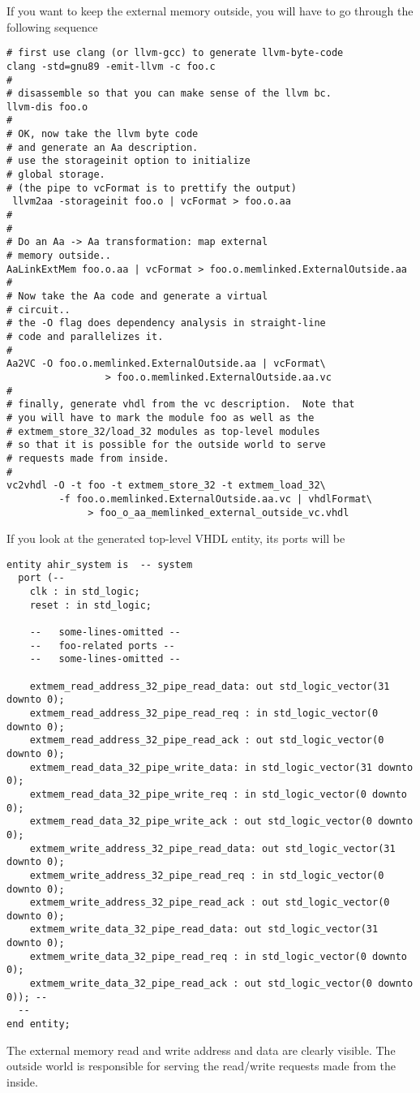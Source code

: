 If you want to keep the external memory
outside, you will have to go through the following sequence
\begin{verbatim}
# first use clang (or llvm-gcc) to generate llvm-byte-code
clang -std=gnu89 -emit-llvm -c foo.c
#
# disassemble so that you can make sense of the llvm bc.
llvm-dis foo.o
#
# OK, now take the llvm byte code
# and generate an Aa description.
# use the storageinit option to initialize
# global storage.
# (the pipe to vcFormat is to prettify the output)
 llvm2aa -storageinit foo.o | vcFormat > foo.o.aa
#
#
# Do an Aa -> Aa transformation: map external
# memory outside..
AaLinkExtMem foo.o.aa | vcFormat > foo.o.memlinked.ExternalOutside.aa
#
# Now take the Aa code and generate a virtual
# circuit..
# the -O flag does dependency analysis in straight-line
# code and parallelizes it.
#
Aa2VC -O foo.o.memlinked.ExternalOutside.aa | vcFormat\
                 > foo.o.memlinked.ExternalOutside.aa.vc
#
# finally, generate vhdl from the vc description.  Note that
# you will have to mark the module foo as well as the
# extmem_store_32/load_32 modules as top-level modules
# so that it is possible for the outside world to serve
# requests made from inside.
#
vc2vhdl -O -t foo -t extmem_store_32 -t extmem_load_32\ 
         -f foo.o.memlinked.ExternalOutside.aa.vc | vhdlFormat\
              > foo_o_aa_memlinked_external_outside_vc.vhdl

\end{verbatim}

If you look at the generated top-level VHDL entity, its ports
will be
\begin{verbatim}
entity ahir_system is  -- system
  port (--
    clk : in std_logic;
    reset : in std_logic;

    --   some-lines-omitted --
    --   foo-related ports --
    --   some-lines-omitted --

    extmem_read_address_32_pipe_read_data: out std_logic_vector(31 downto 0);
    extmem_read_address_32_pipe_read_req : in std_logic_vector(0 downto 0);
    extmem_read_address_32_pipe_read_ack : out std_logic_vector(0 downto 0);
    extmem_read_data_32_pipe_write_data: in std_logic_vector(31 downto 0);
    extmem_read_data_32_pipe_write_req : in std_logic_vector(0 downto 0);
    extmem_read_data_32_pipe_write_ack : out std_logic_vector(0 downto 0);
    extmem_write_address_32_pipe_read_data: out std_logic_vector(31 downto 0);
    extmem_write_address_32_pipe_read_req : in std_logic_vector(0 downto 0);
    extmem_write_address_32_pipe_read_ack : out std_logic_vector(0 downto 0);
    extmem_write_data_32_pipe_read_data: out std_logic_vector(31 downto 0);
    extmem_write_data_32_pipe_read_req : in std_logic_vector(0 downto 0);
    extmem_write_data_32_pipe_read_ack : out std_logic_vector(0 downto 0)); --
  --
end entity;
\end{verbatim}
The external memory read and write address and data are clearly
visible.   The outside world is responsible for serving the
read/write requests made from the inside.

